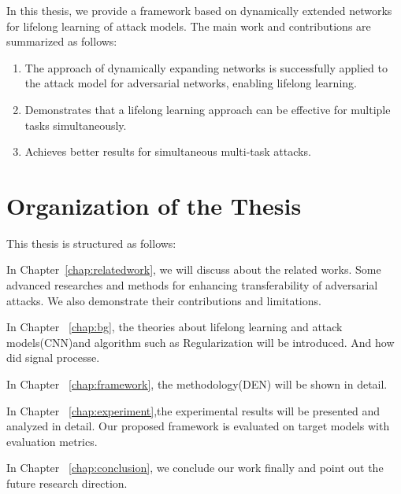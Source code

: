 In this thesis, we provide a framework based on dynamically extended networks for lifelong learning of attack models. The main work and contributions are summarized as follows:
\begin{enumerate}[\qquad  1.]
	\item The approach of dynamically expanding networks is successfully applied to the attack model for adversarial networks, enabling lifelong learning.
	\item Demonstrates that a lifelong learning approach can be effective for multiple tasks simultaneously.
	\item Achieves better results for simultaneous multi-task attacks.
\end{enumerate}


\section{Organization of the Thesis}
This thesis is structured as follows:

In Chapter~\ref{chap:relatedwork}, we will discuss about the related works. Some advanced researches and methods for enhancing transferability of adversarial attacks. We also demonstrate their contributions and limitations.

In Chapter ~\ref{chap:bg}, the theories about lifelong learning and attack models(CNN)and algorithm such as Regularization will be introduced. And how did signal processe.

In Chapter ~\ref{chap:framework}, the methodology(DEN) will be shown in detail.

In Chapter ~\ref{chap:experiment},the experimental results will be presented and analyzed in detail. Our proposed framework is evaluated on target models with evaluation metrics.

In Chapter ~\ref{chap:conclusion}, we conclude our work finally and point out the future research direction.